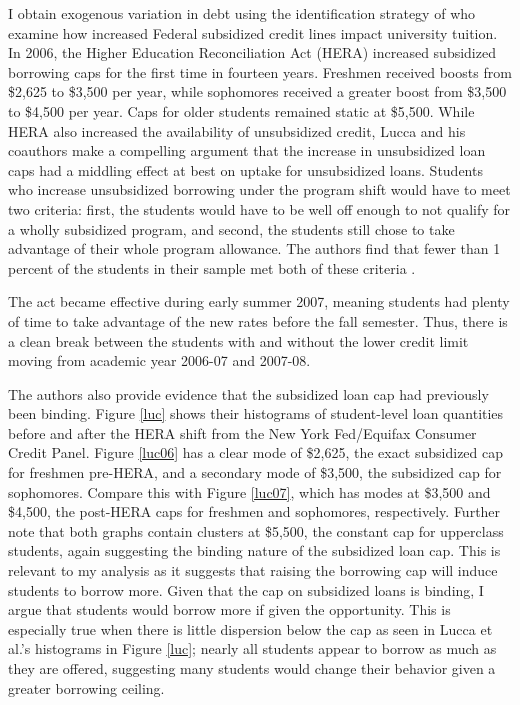 \documentclass[12pt]{article}
\begin{document}
	I obtain exogenous variation in debt using the identification strategy of \textcite{lucca2018} who examine how increased Federal subsidized credit lines impact university tuition. In 2006, the Higher Education Reconciliation Act (HERA) increased subsidized borrowing caps for the first time in fourteen years. Freshmen received boosts from \$2,625 to \$3,500 per year, while sophomores received a greater boost from \$3,500 to \$4,500 per year. Caps for older students remained static at \$5,500. While HERA also increased the availability of unsubsidized credit, Lucca and his coauthors make a compelling argument that the increase in unsubsidized loan caps had a middling effect at best on uptake for unsubsidized loans. Students who increase unsubsidized borrowing under the program shift would have to meet two criteria: first, the students would have to be well off enough to not qualify for a wholly subsidized program, and second, the students still chose to take advantage of their whole program allowance. The authors find that fewer than 1 percent of the students in their sample met both of these criteria \parencite[p. 434]{lucca2018}.
	
	The act became effective during early summer 2007, meaning students had plenty of time to take advantage of the new rates before the fall semester. Thus, there is a clean break between the students with and without the lower credit limit moving from academic year 2006-07 and 2007-08.
	
	The authors also provide evidence that the subsidized loan cap had previously been binding. Figure \ref{luc} shows their histograms of student-level loan quantities before and after the HERA shift from the New York Fed/Equifax Consumer Credit Panel. Figure \ref{luc06} has a clear mode of \$2,625, the exact subsidized cap for freshmen pre-HERA, and a secondary mode of \$3,500, the subsidized cap for sophomores. Compare this with Figure \ref{luc07}, which has modes at \$3,500 and \$4,500, the post-HERA caps for freshmen and sophomores, respectively. Further note that both graphs contain clusters at \$5,500, the constant cap for upperclass students, again suggesting the binding nature of the subsidized loan cap. This is relevant to my analysis as it suggests that raising the borrowing cap will induce students to borrow more. Given that the cap on subsidized loans is binding, I argue that students would borrow more if given the opportunity. This is especially true when there is little dispersion below the cap as seen in Lucca et al.'s histograms in Figure \ref{luc}; nearly all students appear to borrow as much as they are offered, suggesting many students would change their behavior given a greater borrowing ceiling.
	
\end{document}
